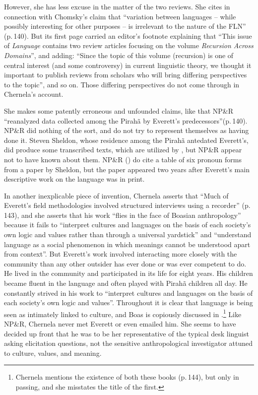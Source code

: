 \documentclass[output=paper,colorlinks,citecolor=brown
]{langscibook}
\begin{document}
However, she has less excuse in the matter of the two reviews.
She cites \citet{Hornstein19} in connection with Chomsky's claim
that ``variation between languages -- while possibly interesting
for other purposes -- is irrelevant to the nature of the FLN'' (p.\,140).
But its first page carried an editor's footnote explaining that
``This issue of \textit{Language} contains two review articles
focusing on the volume \textit{Recursion Across Domains}'',
and adding: ``Since the topic of this volume (recursion) is one of
central interest (and some controversy) in current linguistic theory,
we thought it important to publish reviews from scholars who will
bring differing perspectives to the topic'', and so on.  Those
differing perspectives do not come through in Chernela's account.

She makes some patently erroneous and unfounded claims, like that
NP\&R ``reanalyzed data collected among the Pirah{\~a} by Everett's
predecessors''(p.\,140). NP\&R did nothing of the sort, and do not
try to represent themselves as having done it. Steven Sheldon, whose
residence among the Pirah{\~a} antedated Everett's, did produce some
transcribed texts, which are utilized by \citet{FutrellEtAl16},
but NP\&R appear not to have known about them. NP\&R
(\citeyear[391]{NevPesRod09a}) do cite a table of six pronoun forms
from a paper by Sheldon, but the paper \citep{Sheldon88} appeared two
years after Everett's main descriptive work on the language was in
print.

In another inexplicable piece of invention, Chernela asserts
that ``Much of Everett's field methodologies involved structured
interviews using a recorder'' (p.\,143), and she asserts that his
work ``flies in the face of Boasian anthropology'' because it fails
to ``interpret cultures and languages on the basis of each society's
own logic and values rather than through a universal yardstick'' and
``understand language as a social phenomenon in which meanings cannot
be understood apart from context''. But Everett's work involved
interacting more closely with the community than any other outsider
has ever done or was ever competent to do. He lived in the community
and participated in its life for eight years. His children became
fluent in the language and often played with Pirah{\~a} children
all day.  He constantly strived in his work to ``interpret cultures
and languages on the basis of each society's own logic and values''.
Throughout \citet{Everett12} it is clear that language is being seen
as intimately linked to culture, and Boas is copiously discussed in
\citet{Everett16}.\footnote{\label{chernela}
   Chernela mentions the existence of both these books (p.\,144), but
   only in passing, and she misstates the title of the first.}
Like NP\&R, Chernela never met Everett or even emailed him.
She seems to have decided up front that he was to be her representative
of the typical desk linguist asking elicitation questions, not
the sensitive anthropological investigator attuned to culture, values,
and meaning.
\end{document}
